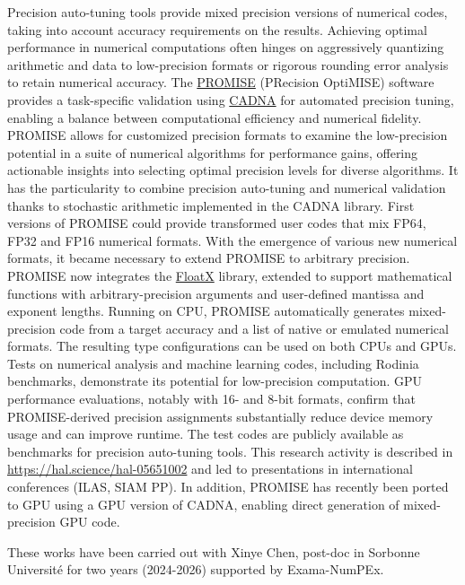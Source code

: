 Precision auto-tuning tools provide mixed precision versions of
numerical codes, taking into account accuracy requirements on the results. 
Achieving optimal performance in numerical computations often hinges on aggressively quantizing arithmetic and data to low-precision formats or rigorous rounding error analysis to retain numerical accuracy. The \href{https://promise.lip6.fr/}{PROMISE} (PRecision OptiMISE) software provides a task-specific validation using  \href{https://cadna.lip6.fr/}{CADNA}  for automated precision tuning, enabling a balance between computational efficiency and numerical fidelity. PROMISE allows for customized precision formats to examine the low-precision potential in a suite of numerical algorithms for performance gains, offering actionable insights into selecting optimal precision levels for diverse algorithms.
It has the particularity to combine precision auto-tuning and
numerical validation thanks to stochastic arithmetic implemented in
the CADNA library.  First versions of PROMISE could provide
transformed user codes that mix FP64, FP32 and FP16 numerical formats.
With the emergence of various new numerical formats, it became
necessary to extend PROMISE to arbitrary precision. 
PROMISE now integrates the
\href{https://github.com/oprecomp/FloatX}{FloatX} library, extended to
support mathematical functions with arbitrary-precision arguments and
user-defined mantissa and exponent lengths. Running on CPU, PROMISE
automatically generates mixed-precision code from a target accuracy
and a list of native or emulated numerical formats. The resulting type
configurations can be used on both CPUs and GPUs. Tests on numerical
analysis and machine learning codes, including Rodinia benchmarks,
demonstrate its potential for low-precision computation. GPU
performance evaluations, notably with 16- and 8-bit formats, 
confirm that PROMISE-derived precision assignments substantially reduce 
device memory usage and can improve runtime. 
The test codes are publicly available as benchmarks for
precision auto-tuning tools.
This research activity is described in \url{https://hal.science/hal-05651002}
and led to presentations in international conferences (ILAS, SIAM PP).
In addition, PROMISE has recently been ported to GPU using a GPU
version of CADNA, enabling direct generation of mixed-precision GPU
code.

These works have been carried out with Xinye Chen, post-doc in
Sorbonne Université for two years (2024-2026) supported by
Exama-NumPEx.


